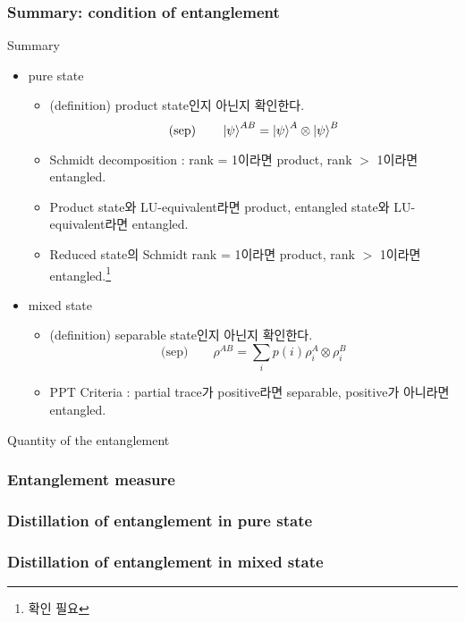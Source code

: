 \documentclass[9pt]{beamer}
\begin{document}
    \begin{frame}
        \frametitle{Summary: condition of entanglement}
        \begin{block}{Summary}
            \begin{itemize}
                \item pure state
                \begin{itemize}
                    \item (definition) product state인지 아닌지 확인한다.
                    \begin{equation*}
                        \text{(sep)} \qquad \ket{\psi}^{AB} = \ket{\psi}^A \otimes \ket{\psi}^B
                    \end{equation*}
                    \item Schmidt decomposition : rank = 1이라면 product, rank $>$ 1이라면 entangled.
                    \item Product state와 LU-equivalent라면 product, entangled state와 LU-equivalent라면 entangled.
                    \item Reduced state의 Schmidt rank = 1이라면 product, rank $>$ 1이라면 entangled.\footnote{확인 필요}
                \end{itemize}
                \item mixed state
                \begin{itemize}
                    \item (definition) separable state인지 아닌지 확인한다.
                        \begin{equation*}
                            \text{(sep)} \qquad \rho^{AB} = \sum_i p(i) \rho_i^A \otimes \rho_i^B
                        \end{equation*}
                    \item PPT Criteria : partial trace가 positive라면 separable, positive가 아니라면 entangled.
                \end{itemize}
            \end{itemize}
        \end{block}
    \end{frame}

    \begin{section}{Quantity of the entanglement}
        \begin{frame}
            \frametitle{Entanglement measure}
            
        \end{frame}

        \begin{frame}
            \frametitle{Distillation of entanglement in pure state}
            
        \end{frame}

        \begin{frame}
            \frametitle{Distillation of entanglement in mixed state}
            
        \end{frame}
    \end{section}
\end{document}
